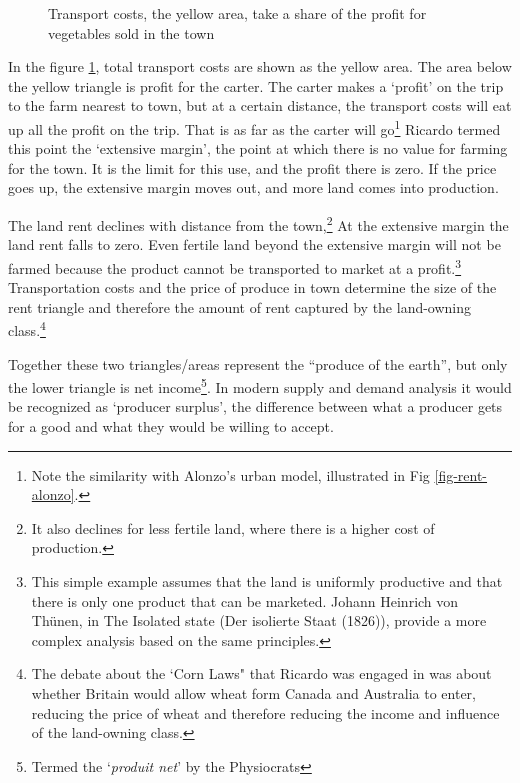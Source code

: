 \begin{figure}
    \begin{center}
    
    \caption{Transport costs, the yellow area, take a share of the profit for vegetables sold in the town}
    \label{fig-rent-ricardo}
    \end{center}
\end{figure}

In the figure \ref{fig-rent-ricardo}, total transport costs are shown as the yellow area. The area below the yellow triangle is profit for the carter. The carter makes a `profit' on the trip to the farm nearest to town, but at a certain distance, the transport costs will eat up all the profit on the trip. That is as far as the carter will go\footnote{Note the similarity with Alonzo's urban model, illustrated in Fig \ref{fig-rent-alonzo}.}
Ricardo termed this point the `extensive margin', the point at which there is no value for farming for the town. It is the limit for this use, and the profit there is zero. If the price goes up, the extensive margin moves out, and more land comes into production.

The land rent declines with distance from the town,\footnote{It also declines for less fertile land, where there is a higher cost of production.} At the extensive margin the land rent falls to zero. Even fertile land beyond the extensive margin will not be farmed because the product cannot be transported to market at a profit.\footnote{This simple example assumes that the land is uniformly productive and that there is only one product that can be marketed. Johann Heinrich von Th\"unen, in The Isolated state (Der isolierte Staat (1826)), provide a more complex analysis based on the same principles.} Transportation costs and the price of produce in town determine the size of the  rent triangle and therefore the amount of rent captured by the land-owning class.\footnote{The debate about the  `Corn Laws" that Ricardo  was engaged in was about whether Britain would allow wheat form Canada and Australia to enter, reducing the price of wheat and therefore reducing the income and influence of the land-owning class.} 

Together these two triangles/areas represent the ``produce of the earth'', but only the lower triangle is net income\footnote{ Termed the `\textit{produit net}' by the Physiocrats}. In modern supply and demand analysis it would be recognized as `producer surplus', the difference between what a producer gets for a good and what they would be willing to accept.

